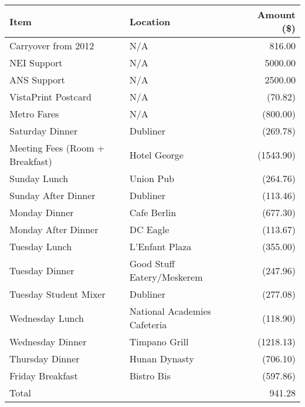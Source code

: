 \begin{center}
\begin{tabular}{llr}
\toprule
Item                            & Location                     & Amount (\$) \\
\midrule
Carryover from 2012             & N/A                          & 816.00  \\
NEI Support                     & N/A                          & 5000.00 \\
ANS Support                     & N/A                          & 2500.00 \\ 
VistaPrint Postcard             & N/A                          & (70.82) \\
Metro Fares                     & N/A                          & (800.00) \\
Saturday Dinner                 & Dubliner                     & (269.78) \\
Meeting Fees (Room + Breakfast) & Hotel George                 & (1543.90) \\
Sunday Lunch                    & Union Pub                    & (264.76) \\
Sunday After Dinner             & Dubliner                     & (113.46) \\
Monday Dinner                   & Cafe Berlin                  & (677.30) \\
Monday After Dinner             & DC Eagle                     & (113.67) \\
Tuesday Lunch                   & L'Enfant Plaza               & (355.00) \\
Tuesday Dinner                  & Good Stuff Eatery/Meskerem   & (247.96) \\
Tuesday Student Mixer           & Dubliner                     & (277.08) \\
Wednesday Lunch                 & National Academies Cafeteria & (118.90) \\
Wednesday Dinner                & Timpano Grill                & (1218.13) \\
Thursday Dinner                 & Hunan Dynasty                & (706.10) \\
Friday Breakfast                & Bistro Bis                   & (597.86) \\
\bottomrule                
Total                           &                              & 941.28 \footnotemark
\end{tabular}
\end{center}

